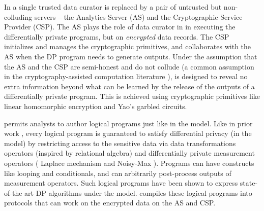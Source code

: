 In \system a single trusted data curator is replaced by a pair of untrusted but non-colluding servers -- the Analytics Server (\textsf{AS}) and the Cryptographic Service Provider (\textsf{CSP}). The \textsf{AS} plays the role of  data curator in \cdp in executing the differentially private programs, but on \textit{encrypted} data records. The \textsf{CSP} initializes and manages the cryptographic primitives, and collaborates with the \textsf{AS} when the DP program needs to generate outputs. Under the assumption that the \textsf{AS} and the \textsf{CSP} are semi-honest and do not collude (a common assumption in the cryptography-assisted computation literature \cite{Boneh1,Boneh2,Ridge2,Matrix2,secureML,LReg,Ver}), \system is designed to reveal no extra information beyond what can be learned by the release of the outputs of a differentially private program. This is achieved using cryptographic primitives like linear homomorphic encryption and Yao's garbled circuits. 

\system permits analysts to author logical programs just like in the \cdp model. Like in prior work \cite{PINQ, FWPINQ, ektelo}, every logical program is guaranteed to satisfy differential privacy (in the \cdp model) by restricting access to the sensitive data via data transformations operators (inspired by relational algebra) and differentially private measurement operators ( Laplace mechanism and Noisy-Max \cite{Dork}). Programs can have constructs like looping and conditionals, and can arbitrarily post-process outputs of measurement operators. Such logical programs have been shown to express state-of-the art DP algorithms under the \cdp model. \system compiles these logical programs into \system protocols that can work on the encrypted data on the \textsf{AS} and \textsf{CSP}. 



